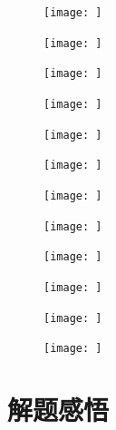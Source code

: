 \documentclass[UTF8]{ctexart}
\begin{document}
\begin{figure}[H]
    \centering
    \texttt{[image: ]}
    \caption{}
\end{figure}

\begin{figure}[H]
    \centering
    \texttt{[image: ]}
    \caption{}
\end{figure}

\begin{figure}[H]
    \centering
    \texttt{[image: ]}
    \caption{}
\end{figure}

\begin{figure}[H]
    \centering
    \texttt{[image: ]}
    \caption{}
\end{figure}

\begin{figure}[H]
    \centering
    \texttt{[image: ]}
    \caption{}
\end{figure}

\begin{figure}[H]
    \centering
    \texttt{[image: ]}
    \caption{}
\end{figure}

\begin{figure}[H]
    \centering
    \texttt{[image: ]}
    \caption{}
\end{figure}

\begin{figure}[H]
    \centering
    \texttt{[image: ]}
    \caption{}
\end{figure}

\begin{figure}[H]
    \centering
    \texttt{[image: ]}
    \caption{}
\end{figure}

\begin{figure}[H]
    \centering
    \texttt{[image: ]}
    \caption{}
\end{figure}

\begin{figure}[H]
    \centering
    \texttt{[image: ]}
    \caption{}
\end{figure}

\begin{figure}[H]
    \centering
    \texttt{[image: ]}
    \caption{}
\end{figure}

\section{解题感悟}
\end{document}
